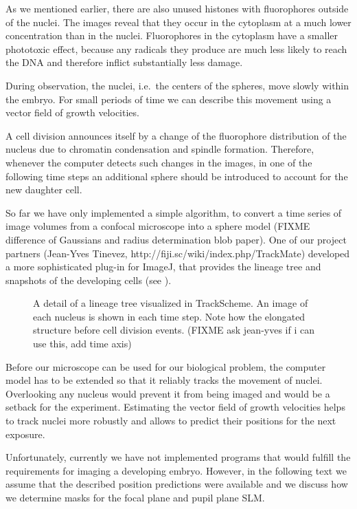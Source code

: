 As we mentioned earlier, there are also unused histones with
fluorophores outside of the nuclei. The images reveal that they occur
in the cytoplasm at a much lower concentration than in the
nuclei. Fluorophores in the cytoplasm have a smaller phototoxic
effect, because any radicals they produce are much less likely to
reach the DNA and therefore inflict substantially less damage.


During observation, the nuclei, i.e.\ the centers of the spheres, move
slowly within the embryo. For small periods of time we can describe
this movement using a vector field of growth velocities.

A cell
division announces itself by a change of the fluorophore distribution of the nucleus
due to chromatin condensation and spindle formation. Therefore, whenever the computer
detects such changes in the images, in one of the following time
steps an additional sphere should be introduced to account for the new
daughter cell.

So far we have only implemented a simple algorithm, to convert a time
series of image volumes from a confocal microscope into a sphere model
(FIXME difference of Gaussians and radius determination blob paper).
One of our project partners (Jean-Yves Tinevez,
http://fiji.sc/wiki/index.php/TrackMate) developed a more
sophisticated plug-in for ImageJ, that provides the lineage tree and
snapshots of the developing cells (see ).
\begin{figure}[!hbt]
  \centering
  \caption{ A detail of a lineage tree visualized in TrackScheme. An
    image of each nucleus is shown in each time step. Note how the
    elongated structure before cell division events. (FIXME ask jean-yves if
    i can use this, add time axis)}
  \label{fig:trackmate}
\end{figure}
Before our microscope can be used for our biological problem, the
computer model has to be extended so that it reliably tracks the
movement of nuclei.  Overlooking any nucleus would prevent it from being 
imaged and would be a setback for the experiment.  Estimating the
vector field of growth velocities helps to track nuclei more robustly
and allows to predict their positions for the next exposure.


Unfortunately, currently we have not implemented programs that would
fulfill the requirements for imaging a developing embryo.  However, in
the following text we assume that the described position predictions
were available and we discuss how we determine masks for the focal
plane and pupil plane SLM.  

